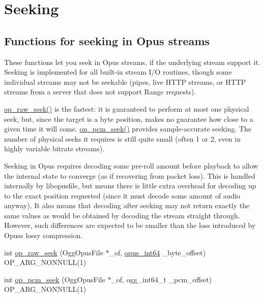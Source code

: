 \hypertarget{group__stream__seeking}{}\section{Seeking}
\label{group__stream__seeking}
\subsection*{Functions for seeking in Opus streams}
\label{_amgrp8473e007a1dbf141b8dfa72682bbc9ed}%
These functions let you seek in Opus streams, if the underlying stream support it. Seeking is implemented for all built-\/in stream I/O routines, though some individual streams may not be seekable (pipes, live H\+T\+TP streams, or H\+T\+TP streams from a server that does not support {\ttfamily Range} requests).

\mbox{\hyperlink{group__stream__seeking_gaf83b0fc6cdf94508876a206ab980851a}{op\+\_\+raw\+\_\+seek()}} is the fastest\+: it is guaranteed to perform at most one physical seek, but, since the target is a byte position, makes no guarantee how close to a given time it will come. \mbox{\hyperlink{group__stream__seeking_gad4f20d0601c2bab8d724f647673ae92c}{op\+\_\+pcm\+\_\+seek()}} provides sample-\/accurate seeking. The number of physical seeks it requires is still quite small (often 1 or 2, even in highly variable bitrate streams).

Seeking in Opus requires decoding some pre-\/roll amount before playback to allow the internal state to converge (as if recovering from packet loss). This is handled internally by {\ttfamily libopusfile}, but means there is little extra overhead for decoding up to the exact position requested (since it must decode some amount of audio anyway). It also means that decoding after seeking may not return exactly the same values as would be obtained by decoding the stream straight through. However, such differences are expected to be smaller than the loss introduced by Opus\textquotesingle{}s lossy compression. \begin{DoxyCompactItemize}
\item 
int \mbox{\hyperlink{group__stream__seeking_gaf83b0fc6cdf94508876a206ab980851a}{op\+\_\+raw\+\_\+seek}} (Ogg\+Opus\+File $\ast$\+\_\+of, \mbox{\hyperlink{opus__types_8h_ab6742070cf9d0ccffca2b80522b4f41a}{opus\+\_\+int64}} \+\_\+byte\+\_\+offset) O\+P\+\_\+\+A\+R\+G\+\_\+\+N\+O\+N\+N\+U\+LL(1)
\item 
int \mbox{\hyperlink{group__stream__seeking_gad4f20d0601c2bab8d724f647673ae92c}{op\+\_\+pcm\+\_\+seek}} (Ogg\+Opus\+File $\ast$\+\_\+of, ogg\+\_\+int64\+\_\+t \+\_\+pcm\+\_\+offset) O\+P\+\_\+\+A\+R\+G\+\_\+\+N\+O\+N\+N\+U\+LL(1)
\end{DoxyCompactItemize}


